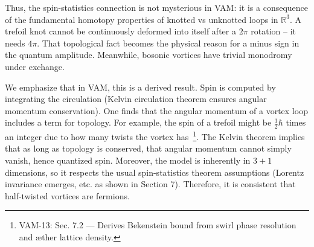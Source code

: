 \documentclass[a4paper,12pt]{article}
\begin{document}
    Thus, the spin-statistics connection is not mysterious in VAM: it is a consequence of the fundamental homotopy properties of knotted vs unknotted loops in $\mathbb{R}^3$. A trefoil knot cannot be continuously deformed into itself after a $2\pi$ rotation -- it needs $4\pi$. That topological fact becomes the physical reason for a minus sign in the quantum amplitude. Meanwhile, bosonic vortices have trivial monodromy under exchange.

    We emphasize that in VAM, this is a derived result. Spin is computed by integrating the circulation (Kelvin circulation theorem ensures angular momentum conservation). One finds that the angular momentum of a vortex loop includes a term for topology. For example, the spin of a trefoil might be $\frac{1}{2}\hbar$ times an integer due to how many twists the vortex has~\footnote{VAM-13: Sec. 7.2 — Derives Bekenstein bound from swirl phase resolution and æther lattice density.}. The Kelvin theorem implies that as long as topology is conserved, that angular momentum cannot simply vanish, hence quantized spin. Moreover, the model is inherently in $3+1$ dimensions, so it respects the usual spin-statistics theorem assumptions (Lorentz invariance emerges, etc. as shown in Section 7). Therefore, it is consistent that half-twisted vortices are fermions.
\end{document}
